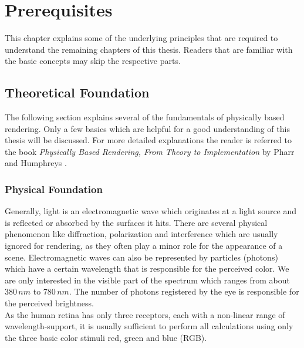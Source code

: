 \documentclass[thesis.tex]{subfiles}
\begin{document}
\chapter{Prerequisites}\label{chap:preq}
This chapter explains some of the underlying principles that are required to understand the remaining chapters of this thesis.
Readers that are familiar with the basic concepts may skip the respective parts.


\section{Theoretical Foundation} \label{sec:preq:theo}
The following section explains several of the fundamentals of physically based rendering.
Only a few basics which are helpful for a good understanding of this thesis will be discussed.
For more detailed explanations the reader is referred to the book \emph{Physically Based Rendering, From Theory to Implementation} by Pharr and Humphreys \cite{bib:pbrt}.

\subsection{Physical Foundation}
Generally, light is an electromagnetic wave which originates at a light source and is reflected or absorbed by the surfaces it hits.
There are several physical phenomenon like diffraction, polarization and interference which are usually ignored for rendering, as they often play a minor role for the appearance of a scene.
Electromagnetic waves can also be represented by particles (photons) which have a certain wavelength that is responsible for the perceived color.
We are only interested in the visible part of the spectrum which ranges from about $380\,nm$ to $780\,nm$.
The number of photons registered by the eye is responsible for the perceived brightness.
\\
As the human retina has only three receptors, each with a non-linear range of wavelength-support, it is usually sufficient to perform all calculations using only the three basic color stimuli red, green and blue \cite{bib:colorscience} (RGB).
\end{document}
